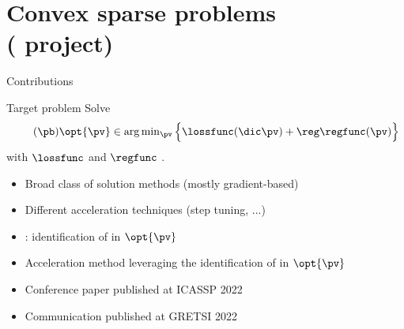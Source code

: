 \section{Convex sparse problems \\ {\small ( project)}}

\begin{frame}{Contributions}

  \begin{block}{Target problem}
    Solve
    \begin{equation}
      \label{prob:convex-sparse-problem}
      \tag{$\pb$}
      \opt{\pv} \in \textstyle\arg\min_{\pv} \Big\{ \lossfunc(\dic\pv) + \reg\regfunc(\pv) \Big\}
    \end{equation}
    with $\lossfunc$ and $\regfunc$ .
  \end{block}
  
  \begin{itemize}
    \item<2-> Broad class of solution methods (mostly gradient-based)
    \item<3-> Different acceleration techniques (step tuning, \etc...)
    \item<4->  : identification of  in $\opt{\pv}$
  \end{itemize}
  \begin{itemize}
    \item<5-> Acceleration method leveraging the identification of  in $\opt{\pv}$
    \item<6-> Conference paper published at ICASSP 2022
    \item<7-> Communication published at GRETSI 2022
  \end{itemize}
\end{frame}

